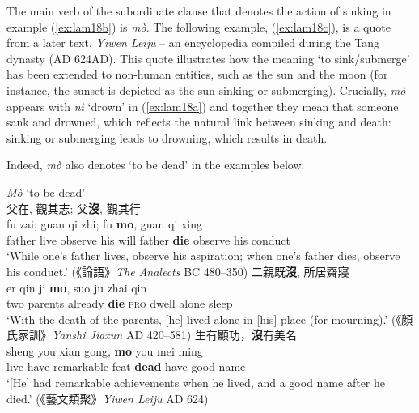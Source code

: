 \documentclass[output=paper]{langscibook}
\begin{document}
The main verb of the subordinate clause that denotes the action of sinking in example (\ref{ex:lam18b}) is \textit{mò}. The following example, (\ref{ex:lam18c}), is a quote from a later text, \emph{Yiwen Leiju} – an encyclopedia compiled during the Tang dynasty (AD 624AD). This quote illustrates how the meaning `to sink/submerge' has been extended to non-human entities, such as the sun and the moon (for instance, the sunset is depicted as the sun sinking or submerging). Crucially, \textit{mò} appears with \textit{nì} `drown' in (\ref{ex:lam18a}) and together they mean that someone sank and drowned, which reflects the natural link between sinking and death: sinking or submerging leads to drowning, which results in death. 

Indeed, \textit{mò} also denotes `to be dead' in the examples below: 

\ea \textit{Mò} `to be dead'  \label{ex:lam19}\\
  \ea 父在, 觀其志; 父\textbf{沒}, 觀其行 \label{ex:lam19a}\\
  	\gll fu zai, guan qi zhi; fu \textbf{mo}, guan qi xing\\
  	father live observe	his	will father	\textbf{die} observe his	conduct\\
  	\glt `While one's father lives, observe his aspiration; when one's father dies, observe his conduct.' (《論語》\emph{The Analects} BC 480–350)  
  \ex 二親既\textbf{沒}, 所居齋寢 \label{ex:lam19b}\\
  	\gll er	qin	ji \textbf{mo}, suo ju zhai qin\\
  	two	parents	already	\textbf{die} \textsc{pro} dwell alone	sleep\\
  	\glt `With the death of the parents, [he] lived alone in [his] place (for mourning).' (《顏氏家訓》\emph{Yanshi Jiaxun} AD 420–581) 
  \ex 生有顯功，\textbf{沒}有美名 \label{ex:lam19c}\\
	\gll sheng you xian gong, \textbf{mo} you mei ming\\ 
	live have remarkable feat \textbf{dead} have	good name\\
	\glt `[He] had remarkable achievements when he lived, and a good name after he died.' (《藝文類聚》\emph{Yiwen Leiju} AD 624)
\z \z
\end{document}
